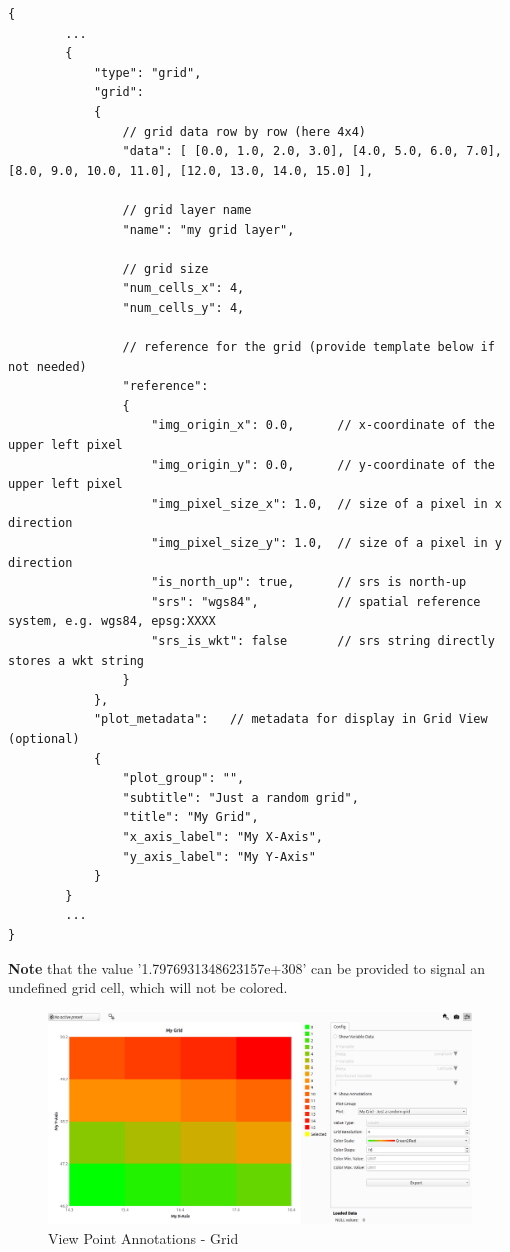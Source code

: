 \begin{lstlisting}[basicstyle=\small\ttfamily]
{
        ...
        {
            "type": "grid",
            "grid": 
            {
                // grid data row by row (here 4x4)
                "data": [ [0.0, 1.0, 2.0, 3.0], [4.0, 5.0, 6.0, 7.0], [8.0, 9.0, 10.0, 11.0], [12.0, 13.0, 14.0, 15.0] ],

                // grid layer name
                "name": "my grid layer",

                // grid size
                "num_cells_x": 4,
                "num_cells_y": 4,

                // reference for the grid (provide template below if not needed)
                "reference": 
                {
                    "img_origin_x": 0.0,      // x-coordinate of the upper left pixel
                    "img_origin_y": 0.0,      // y-coordinate of the upper left pixel
                    "img_pixel_size_x": 1.0,  // size of a pixel in x direction
                    "img_pixel_size_y": 1.0,  // size of a pixel in y direction
                    "is_north_up": true,      // srs is north-up
                    "srs": "wgs84",           // spatial reference system, e.g. wgs84, epsg:XXXX
                    "srs_is_wkt": false       // srs string directly stores a wkt string
                }
            },
            "plot_metadata":   // metadata for display in Grid View (optional)
            {
                "plot_group": "",
                "subtitle": "Just a random grid",
                "title": "My Grid",
                "x_axis_label": "My X-Axis",
                "y_axis_label": "My Y-Axis"
            }
        }
        ...                  
}
\end{lstlisting}

\textbf{Note} that the value '1.7976931348623157e+308' can be provided to signal an undefined grid cell, which will not be colored.

\begin{figure}[H]
    \center
        \includegraphics[width=15cm]{figures/viewpoints_anno_example_grid.png}
    \caption{View Point Annotations - Grid} 
\end{figure}

